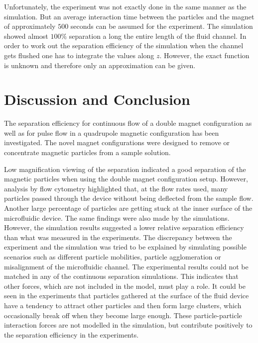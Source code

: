 Unfortunately, the experiment was not exactly done in the same manner as the simulation. But an average interaction time between the particles and the magnet of approximately $500$ seconds can be assumed for the experiment. The simulation showed almost $100\%$ separation a long the entire length of the fluid channel. In order to work out the separation efficiency of the simulation when the channel gets flushed one has to integrate the values along $z$. However, the exact function is unknown and therefore only an approximation can be given. 
 

\section{Discussion and Conclusion}\label{sec:discussionAndConclusionMagneticSeparation}
The separation efficiency for continuous flow of a double magnet configuration as well as for pulse flow in a quadrupole magnetic configuration has been investigated. The novel magnet configurations were designed to remove or concentrate magnetic particles from a sample solution.

Low magnification viewing of the separation indicated a good separation of the magnetic particles when using the double magnet configuration setup. However, analysis by flow cytometry highlighted that, at the flow rates used, many particles passed through the device without being deflected from the sample flow. Another large percentage of particles are getting stuck at the inner surface of the microfluidic device. The same findings were also made by the simulations. However, the simulation results suggested a lower relative separation efficiency than what was measured in the experiments. The discrepancy between the experiment and the simulation was tried to be explained by simulating possible scenarios such as different particle mobilities, particle agglomeration or misalignment of the microfluidic channel. The experimental results could not be matched in any of the continuous separation simulations. This indicates that other forces, which are not included in the model, must play a role. It could be seen in the experiments that particles gathered at the surface of the fluid device have a tendency to attract other particles and then form large clusters, which occasionally break off when they become large enough. These particle-particle interaction forces are not modelled in the simulation, but contribute positively to the separation efficiency in the experiments. 

